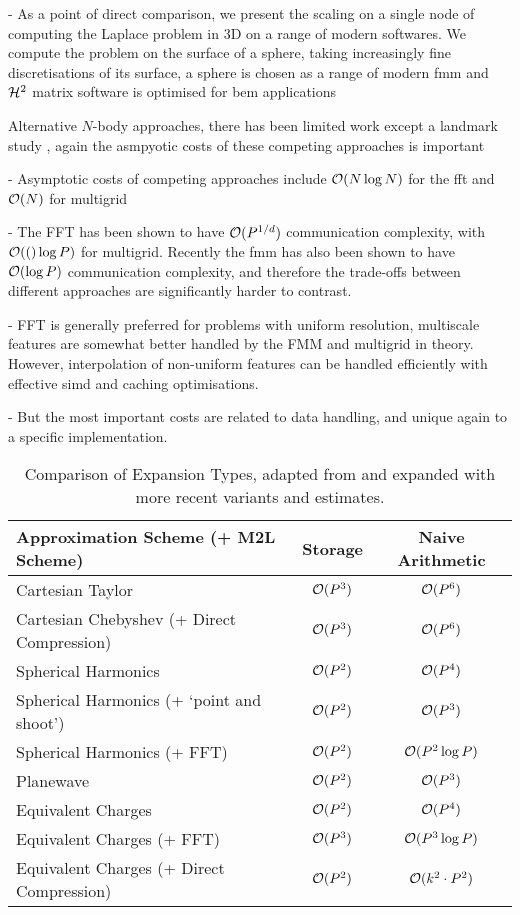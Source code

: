 - As a point of direct comparison, we present the scaling on a single node of computing the Laplace problem in 3D on a range of modern softwares. We compute the problem on the surface of a sphere, taking increasingly fine discretisations of its surface, a sphere is chosen as a range of modern \acrshort{fmm} and $\mathcal{H}^2$ matrix software is optimised for \acrfull{bem} applications

Alternative $N$-body approaches, there has been limited work except a landmark study \cite{gholami2016fft}, again the asmpyotic costs of these competing approaches is important

- Asymptotic costs of competing approaches include $\mathcal{O}(N \log{N})$ for the \acrshort{fft} and $\mathcal{O}(N)$ for multigrid

- The FFT has been shown to have $\mathcal{O}(P^{1/d})$ communication complexity, with $\mathcal{O}(()\log{P})$ for multigrid. Recently the \acrshort{fmm} has also been shown to have $\mathcal{O}(\log{P})$ communication complexity, and therefore the trade-offs between different approaches are significantly harder to contrast.

- FFT is generally preferred for problems with uniform resolution, multiscale features are somewhat better handled by the FMM and multigrid in theory. However, interpolation of non-uniform features can be handled efficiently with effective \acrshort{simd} and caching optimisations.

- But the most important costs are related to data handling, and unique again to a specific implementation.

\begin{table}[ht]
    \centering
    \caption{Comparison of Expansion Types, adapted from \cite{Yokota2013} and expanded with more recent variants and estimates.}
    \begin{tabular}{lcc} %
    \toprule
    \textbf{Approximation Scheme (+ M2L Scheme)} & \textbf{Storage} & \textbf{Naive Arithmetic} \\
    \midrule
    Cartesian Taylor & $\mathcal{O}(P^3)$ & $\mathcal{O}(P^6)$ \\
    Cartesian Chebyshev (+ Direct Compression) & $\mathcal{O}(P^3)$ & $\mathcal{O}(P^6)$ \\
    Spherical Harmonics & $\mathcal{O}(P^2)$ & $\mathcal{O}(P^4)$ \\
    Spherical Harmonics (+ `point and shoot') & $\mathcal{O}(P^2)$ & $\mathcal{O}(P^3)$ \\
    Spherical Harmonics (+ FFT) & $\mathcal{O}(P^2)$ & $\mathcal{O}(P^2 \log{P})$ \\
    Planewave & $\mathcal{O}(P^2)$ & $\mathcal{O}(P^3)$ \\
    Equivalent Charges & $\mathcal{O}(P^2)$ & $\mathcal{O}(P^4)$ \\
    Equivalent Charges (+ FFT) & $\mathcal{O}(P^3)$ & $\mathcal{O}(P^3 \log{P})$ \\
    Equivalent Charges (+ Direct Compression) & $\mathcal{O}(P^2)$ & $\mathcal{O}(k^2 \cdot P^2)$ \\
    \bottomrule
\end{tabular}
\end{table}


